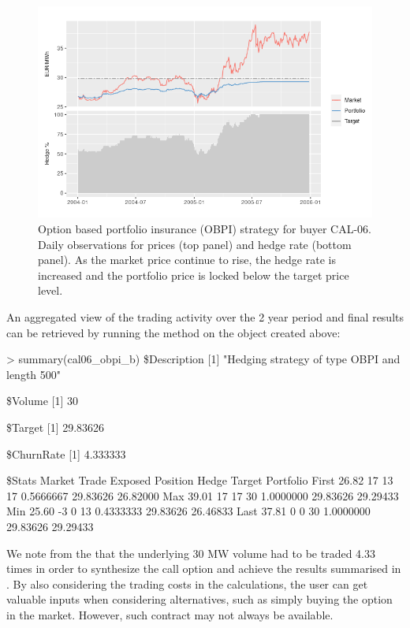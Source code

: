 \begin{figure}[ht!]
\includegraphics [scale = 0.7] {cal06_obpi_long.png}
\caption{Option based portfolio insurance (OBPI) strategy for buyer CAL-06. Daily observations for prices (top panel) and hedge rate (bottom panel). As the market price continue to rise, the hedge rate is increased and the portfolio price is locked below the target price level.}
\label{fig:cal06_obpi_long}
\end{figure}

An aggregated view of the trading activity over the 2 year period  and final results can be retrieved by running the  method on the object created above:\\

\begin{example*}
> summary(cal06_obpi_b)
\$Description
[1] "Hedging strategy of type OBPI and length 500"

\$Volume
[1] 30

\$Target
[1] 29.83626

\$ChurnRate
[1] 4.333333


\$Stats
      Market Trade Exposed Position     Hedge   Target Portfolio
First  26.82    17      13       17 0.5666667 29.83626  26.82000
Max    39.01    17      17       30 1.0000000 29.83626  29.29433
Min    25.60    -3       0       13 0.4333333 29.83626  26.46833
Last   37.81     0       0       30 1.0000000 29.83626  29.29433
\end{example*}

\noindent We note from the  that the underlying 30 MW volume had to be traded 4.33 times in order to synthesize the call option and achieve the results summarised in . By also considering the trading costs in the calculations, the user can get valuable inputs when considering alternatives, such as simply buying the option in the market. However, such contract may not always be available.   

